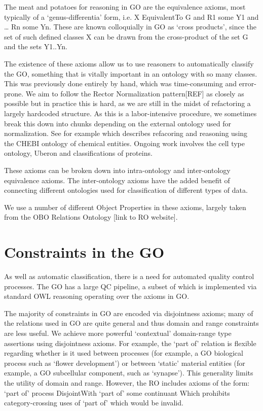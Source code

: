 \documentclass{llncs}
\begin{document}
The meat and potatoes for reasoning in GO are the equivalence axioms, most typically of a ‘genus-differentia’ form, i.e. X EquivalentTo G and R1 some Y1 and … Rn some Yn. These are known colloquially in GO as ‘cross products’, since the set of such defined classes X can be drawn from the cross-product of the set G and the sets Y1..Yn.

The existence of these axioms allow us to use reasoners to automatically classify the GO, something that is vitally important in an ontology with so many classes. This was previously done entirely by hand, which was time-consuming and error-prone. We aim to follow the Rector Normalization pattern[REF] as closely as possible but in practice this is hard, as we are still in the midst of refactoring a largely hardcoded structure. As this is a labor-intensive procedure, we sometimes break this down into chunks depending on the external ontology used for normalization. See for example \cite{Hill2013} which describes refacoring and reasoning using the CHEBI ontology of chemical entities. Ongoing work involves the cell type ontology, Uberon and classifications of proteins.

These axioms can be broken down into intra-ontology and inter-ontology equivalence axioms. %
The inter-ontology axioms have the added benefit of connecting different ontologies used for classification of different types of data.

We use a number of different Object Properties in these axioms, largely taken from the OBO Relations Ontology [link to RO website].

\section{Constraints in the GO}


As well as automatic classification, there is a need for automated quality control processes. The GO has a large QC pipeline, a subset of which is implemented via standard OWL reasoning operating over the axioms in GO.

The majority of constraints in GO are encoded via disjointness axioms; many of the relations used in GO are quite general and thus domain and range constraints are less useful. We achieve more powerful ‘contextual’ domain-range type assertions using disjointness axioms. For example, the `part of' relation is flexible regarding whether is it used between processes (for example, a GO biological process such as ‘flower development’) or between ‘static’ material entities (for example, a GO subcellular component, such as ‘synapse’). This generality limits the utility of domain and range. However, the RO includes axioms of the form:
    `part of' process DisjointWith `part of' some continuant
Which prohibits category-crossing uses of `part of' which would be invalid.
\end{document}

